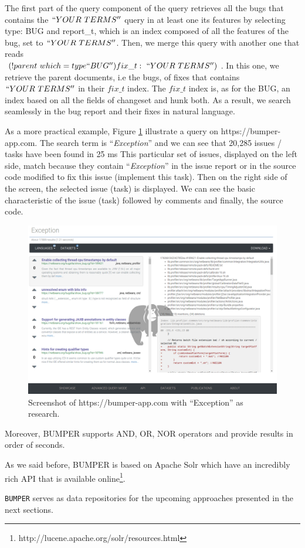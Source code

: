 The first part of the query component of the query retrieves all the bugs that contains the $``YOUR~TERMS''$ query in at least one its features by selecting type: BUG and report\_t, which is an index composed of all the features of the bug, set to $``YOUR~TERMS''$.
Then, we merge this query with another one that reads \\
$(!parent~which=type``BUG'')fix\_t:~``YOUR~TERMS'')$.
In this one, we retrieve the parent documents, i.e the bugs, of fixes that contains $``YOUR~TERMS''$ in their $fix\_t$ index.
The $fix\_t$ index is, as for the BUG, an index based on all the fields of changeset and hunk both. As a result, we search seamlessly in the bug report and their fixes in natural language.

As a more practical example, Figure \ref{fig:bumper-live} illustrate a query on https://bumper-app.com. The search term is  ``{\it Exception}'' and we can see that 20,285 issues / tasks have been found in 25 ms This particular set of issues, displayed on the left side, match because they contain ``{\it Exception}'' in the issue report or in the source code modified to fix this issue (implement this task). Then on the right side of the screen, the selected issue (task) is displayed. We can see the basic characteristic of the issue (task) followed by comments and finally, the source code.

\begin{figure}[h!]
  \centering
    \includegraphics[scale=0.3]{media/bumper-live.png}
    \caption{Screenshot of https://bumper-app.com with ``Exception'' as research.
    \label{fig:bumper-live}}
\end{figure}


Moreover, BUMPER supports AND, OR, NOR operators and provide results in order of seconds.

As we said before, BUMPER is based on Apache Solr which have an incredibly rich API that is available online\footnote{ http://lucene.apache.org/solr/resources.html}.

{\tt BUMPER} serves as data repositories for the upcoming approaches presented in the next sections.

